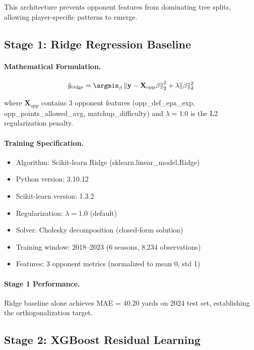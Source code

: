 \noindent This architecture prevents opponent features from dominating tree splits, allowing player-specific patterns to emerge.

\subsection{Stage 1: Ridge Regression Baseline}

\paragraph{Mathematical Formulation.}
\begin{equation}
\label{eq:ridge-baseline}
\hat{y}_{\text{ridge}} = \argmin_{\beta} \left\| \mathbf{y} - \mathbf{X}_{\text{opp}} \beta \right\|_2^2 + \lambda \|\beta\|_2^2
\end{equation}

\noindent where $\mathbf{X}_{\text{opp}}$ contains 3 opponent features (opp\_def\_epa\_exp, opp\_points\_allowed\_avg, matchup\_difficulty) and $\lambda = 1.0$ is the L2 regularization penalty.

\paragraph{Training Specification.}
\begin{itemize}[itemsep=1pt,parsep=0pt]
    \item Algorithm: Scikit-learn Ridge (sklearn.linear\_model.Ridge)
    \item Python version: 3.10.12
    \item Scikit-learn version: 1.3.2
    \item Regularization: $\lambda = 1.0$ (default)
    \item Solver: Cholesky decomposition (closed-form solution)
    \item Training window: 2018--2023 (6 seasons, 8,234 observations)
    \item Features: 3 opponent metrics (normalized to mean 0, std 1)
\end{itemize}

\paragraph{Stage 1 Performance.}
Ridge baseline alone achieves MAE = 40.20 yards on 2024 test set, establishing the orthogonalization target.

\subsection{Stage 2: XGBoost Residual Learning}

